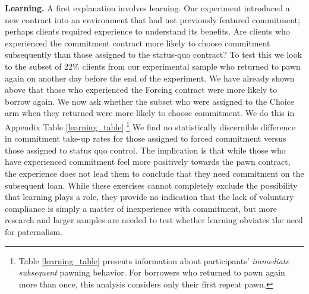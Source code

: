 \documentclass[ecta,nameyear,final]{econsocart}
\begin{document}
\noindent \textbf{Learning.} A first explanation involves learning. Our experiment introduced a new contract into an environment that had not previously featured commitment; perhaps clients required experience to understand its benefits. Are clients who experienced the commitment contract more likely to choose commitment subsequently than those assigned to the status-quo contract? To test this we look to the subset of 22\% clients from our experimental sample who returned to pawn again on another day before the end of the experiment. We have already shown above that those who experienced the Forcing contract were more likely to borrow again.  We now ask whether the subset who were assigned to the Choice arm when they returned were more likely to choose commitment.  We do this in Appendix Table \ref{learning_table}.\footnote{Table \ref{learning_table} presents information about participants' \emph{immediate subsequent} pawning behavior.  For borrowers who returned to pawn again more than once, this analysis considers only their first repeat pawn.}
We find no statistically discernible difference in commitment take-up rates for those assigned to forced commitment versus those assigned to status quo control. The implication is that while those who have experienced commitment feel more positively towards the pawn contract, the experience does not lead them to conclude that they need commitment on the subsequent loan.  While these exercises cannot completely exclude the possibility that learning plays a role, they provide no indication that the lack of voluntary compliance is simply a matter of inexperience with commitment, but more research and larger samples are needed to test whether learning obviates the need for paternalism.
\end{document}
